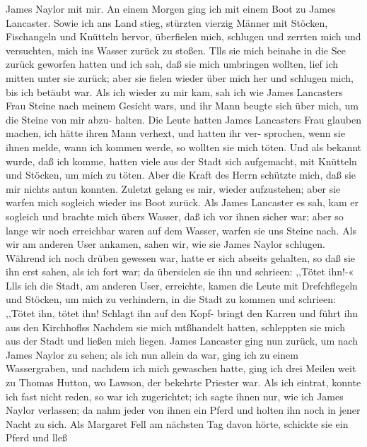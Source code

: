 James Naylor mit mir. An einem Morgen ging ich mit einem
Boot zu James Lancaster. Sowie ich ans Land stieg, stürzten vierzig
Männer mit Stöcken, Fischangeln und Knütteln hervor, überfielen
mich, schlugen und zerrten mich und versuchten, mich ins Wasser zurück
zu stoßen. Tlls sie mich beinahe in die See zurück geworfen hatten
und ich sah, daß sie mich umbringen wollten, lief ich mitten unter sie
zurück; aber sie fielen wieder über mich her und schlugen mich,
bis ich betäubt war. Als ich wieder zu mir kam, sah ich wie
James Lancasters Frau Steine nach meinem Gesicht wars, und
ihr Mann beugte sich über mich, um die Steine von mir abzu-
halten. Die Leute hatten James Lancasters Frau glauben
machen, ich hätte ihren Mann verhext, und hatten ihr ver-
sprochen, wenn sie ihnen melde, wann ich kommen werde, so
wollten sie mich töten. Und als bekannt wurde, daß ich komme,
hatten viele aus der Stadt sich aufgemacht, mit Knütteln und
Stöcken, um mich zu töten. Aber die Kraft des Herrn
schützte mich, daß sie mir nichts antun konnten. Zuletzt gelang
es mir, wieder aufzustehen; aber sie warfen mich sogleich wieder
ins Boot zurück. Als James Lancaster es sah, kam er sogleich
und brachte mich übers Wasser, daß ich vor ihnen sicher war;
aber so lange wir noch erreichbar waren auf dem Wasser, warfen
sie uns Steine nach. Als wir am anderen User ankamen, sahen
wir, wie sie James Naylor schlugen. Während ich noch drüben
gewesen war, hatte er sich abseits gehalten, so daß sie ihn erst sahen,
als ich fort war; da übersielen sie ihn und schrieen: ,,Tötet ihn!-«
Llls ich die Stadt, am anderen User, erreichte, kamen die
Leute mit Drefchflegeln und Stöcken, um mich zu verhindern, in
die Stadt zu kommen und schrieen: ,,Tötet ihn, tötet ihn! Schlagt
ihn auf den Kopf- bringt den Karren und führt ihn aus den
Kirchhoflss Nachdem sie mich mtßhandelt hatten, schleppten sie
mich aus der Stadt und ließen mich liegen. James Lancaster
ging nun zurück, um nach James Naylor zu sehen; als ich nun
allein da war, ging ich zu einem Wassergraben, und nachdem ich
mich gewaschen hatte, ging ich drei Meilen weit zu Thomas
Hutton, wo Lawson, der bekehrte Priester war. Als ich eintrat,
konnte ich fast nicht reden, so war ich zugerichtet; ich sagte ihnen nur,
wie ich James Naylor verlassen; da nahm jeder von ihnen ein
Pferd und holten ihn noch in jener Nacht zu sich. Als Margaret
Fell am nächsten Tag davon hörte, schickte sie ein Pferd und lleß


